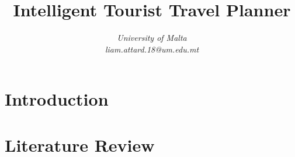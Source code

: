 \documentclass[conference]{IEEEtran}
\title{Intelligent Tourist Travel Planner}
\author{\IEEEauthorblockN{Liam Attard [0299300L] }
\IEEEauthorblockA{Department of Artificial Intelligence} 
\textit{University of Malta}\\
\textit{liam.attard.18@um.edu.mt}}
\begin{document}
  \maketitle

  \section{Introduction}
    

  \section{Literature Review}

  
  
\end{document}
